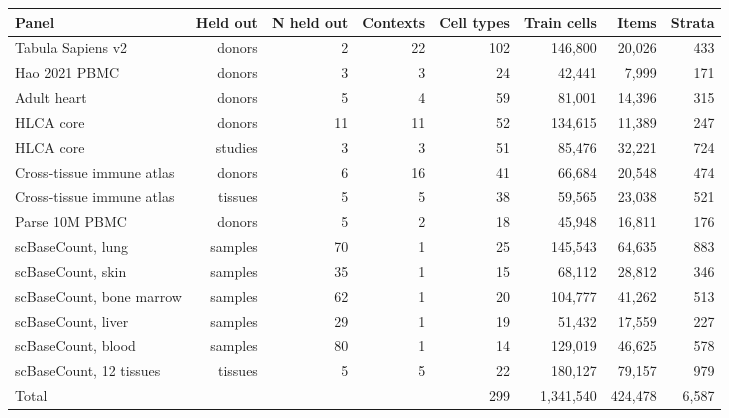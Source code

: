 \begin{tabular}{@{}lrrrrrrr@{}}
\toprule
Panel & Held out & N held out & Contexts & Cell types & Train cells & Items & Strata \\
\midrule
Tabula Sapiens v2 & donors & 2 & 22 & 102 & 146,800 & 20,026 & 433 \\
Hao 2021 PBMC & donors & 3 & 3 & 24 & 42,441 & 7,999 & 171 \\
Adult heart & donors & 5 & 4 & 59 & 81,001 & 14,396 & 315 \\
HLCA core & donors & 11 & 11 & 52 & 134,615 & 11,389 & 247 \\
HLCA core & studies & 3 & 3 & 51 & 85,476 & 32,221 & 724 \\
Cross-tissue immune atlas & donors & 6 & 16 & 41 & 66,684 & 20,548 & 474 \\
Cross-tissue immune atlas & tissues & 5 & 5 & 38 & 59,565 & 23,038 & 521 \\
Parse 10M PBMC & donors & 5 & 2 & 18 & 45,948 & 16,811 & 176 \\
scBaseCount, lung & samples & 70 & 1 & 25 & 145,543 & 64,635 & 883 \\
scBaseCount, skin & samples & 35 & 1 & 15 & 68,112 & 28,812 & 346 \\
scBaseCount, bone marrow & samples & 62 & 1 & 20 & 104,777 & 41,262 & 513 \\
scBaseCount, liver & samples & 29 & 1 & 19 & 51,432 & 17,559 & 227 \\
scBaseCount, blood & samples & 80 & 1 & 14 & 129,019 & 46,625 & 578 \\
scBaseCount, 12 tissues & tissues & 5 & 5 & 22 & 180,127 & 79,157 & 979 \\
\midrule
Total & & & & 299 & 1,341,540 & 424,478 & 6,587 \\
\bottomrule
\end{tabular}

